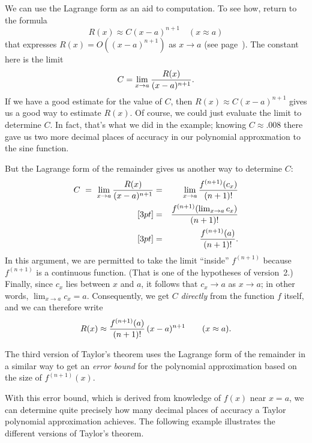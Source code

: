 {{{{        We can use the Lagrange form 
as an aid to computation.  To see how, return to the formula 
        \[
R(x) \approx C (x - a)^{n+1} \quad (x \approx a)
\]
that expresses $R(x) = O((x - a)^{n+1})$ as $x \to a$ (see page~\pageref{order}).  The constant here is the limit
        \[
C = \lim_{x \to a} {R(x) \over (x - a)^{n+1}}.
\]
If we have a good estimate for the value of $C$, then $R(x) \approx C (x - a)^{n+1}$ gives us a good way to estimate $R(x)$.   Of course, we could just evaluate the limit to determine $C$.  In fact, that's what we did in the example; knowing $C \approx .008$ there gave us two more decimal places of accuracy in our polynomial approxmation to the sine function.   

        But the Lagrange form of the remainder 
gives us another way to determine $C$:  \begin{eqnarray*}
        C \ = \ \lim_{x \to a} {R(x) \over (x - a)^{n+1}} &=&
                \lim_{x \to a} {f^{(n+1)}(c_x) \over (n+1)!} \\ [3pt]
                &=& {f^{(n+1)}(\lim_{x \to a} c_x) \over (n+1)!} \\ [3pt]
                &=& {f^{(n+1)}(a) \over (n+1)!}.
        \end{eqnarray*}
In this argument, we are permitted to take the limit ``inside'' $f^{(n+1)}$ because $f^{(n+1)}$ is a continuous function.   (That is one of the hypotheses of version~2.)  Finally, since $c_x$ lies between $x$ and $a$, it follows that $c_x  \to a$ as $x \to a$; in other words, $\lim_{x \to a}c_x = a$.  Consequently, we get $C$ {\em directly\/} from the function $f$ itself, and we can therefore write
        \[
R(x) \approx {f^{(n+1)}(a) \over (n+1)!} \, (x - a)^{n+1} \qquad
                (x \approx a).
\]

        The third version of Taylor's theorem 
uses the Lagrange form of the remainder in a similar way to get an {\em error bound\/} for the polynomial approximation based on the size of $f^{(n+1)}(x)$.
\begin{center}
\end{center}
With this error bound, which is derived from knowledge of $f(x)$ near $x = a$, we can determine quite precisely how many decimal places of accuracy a Taylor polynomial approximation achieves.  The following example illustrates the different versions of Taylor's theorem.


}}}}
